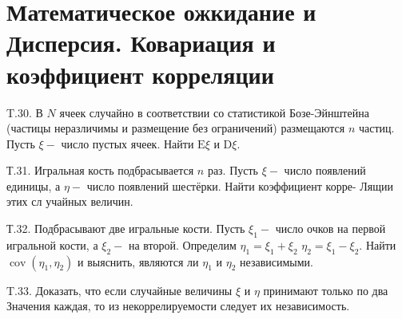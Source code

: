 \documentclass[a4paper,12pt]{article} %
\begin{document}
\section{Математическое ожкидание и Дисперсия. Ковариация и коэффициент корреляции}


\begin{example}

T.30. В $N$ ячеек случайно в соответствии со статистикой Бозе-Эйнштейна (частицы неразличимы и размещение без ограничений) размещаются $n$ частиц. Пусть $\xi-$ число пустых ячеек. Найти $\mathrm{E} \xi$ и $\mathrm{D} \xi$.




\end{example}







\begin{example}


Т.31. Игральная кость подбрасывается $n$ раз. Пусть $\xi-$ число появлений единицы, а $\eta-$ число появлений шестёрки. Найти коэффициент корре-
Лящии этих сл учайных величин.



\end{example}



\begin{example}


Т.32. Подбрасывают две игральные кости. Пусть $\xi_{1}-$ число очков на первой игральной кости, а $\xi_{2}-$ на второй. 
Определим $\eta_{1}=\xi_{1}+\xi_{2}$ $\eta_{2}=\xi_{1}-\xi_{2} .$ 
Найти $\operatorname{cov}\left(\eta_{1},\eta_{2}\right)$ и выяснить, являются ли $\eta_{1}$ и $\eta_{2}$ независимыми.





\end{example}



\begin{example}

T.33. Доказать, что если случайные величины $\xi$ и $\eta$ принимают только
по два Значения каждая, то из некоррелируемости следует их независимость.




\end{example}
\end{document}
